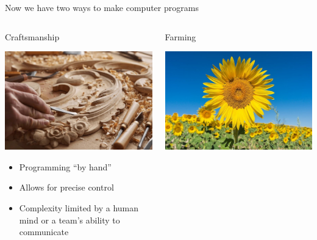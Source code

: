 \documentclass[aspectratio=169]{beamer}
\begin{document}
\begin{frame}{Now we have two ways to make computer programs}
\vspace{-0.5 cm}

\begin{columns}[t]
\begin{center}
\Large Craftsmanship

\vspace{0.25 cm}
\includegraphics[width=0.8\linewidth]{img/craftsmanship.jpg}

\normalsize
\vspace{0.25 cm}
\begin{itemize}
\item Programming ``by hand''
\item Allows for precise control
\item Complexity limited by a human mind or a team's ability to communicate
\end{itemize}
\end{center}

\begin{center}
\Large Farming

\vspace{0.25 cm}
\includegraphics[width=0.8\linewidth]{img/farming.jpg}


\end{center}
\end{columns}
\end{frame}
\end{document}
